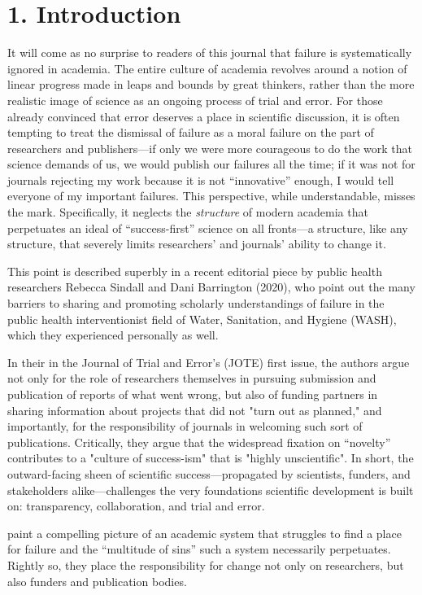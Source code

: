 \documentclass[empirical, author-date]{jote-article}
\author[0]{Stefan Gaillard}{\orcid{https://orcid.org/0000-0003-1956-7325}}
\affil[1]{}
\author[1]{Sean Devine}{\orcid{https://orcid.org/0000-0002-0445-2763}}
\affil[2]{}
\begin{document}
  \section{1. Introduction}

It will come as no surprise to readers of this journal that failure is systematically ignored in academia. The entire culture of academia revolves around a notion of linear progress made in leaps and bounds by great thinkers, rather than the more realistic image of science as an ongoing process of trial and error. For those already convinced that error deserves a place in scientific discussion, it is often tempting to treat the dismissal of failure as a moral failure on the part of researchers and publishers—if only we were more courageous to do the work that science demands of us, we would publish our failures all the time; if it was not for journals rejecting my work because it is not “innovative” enough, I would tell everyone of my important failures. This perspective, while understandable, misses the mark. Specifically, it neglects the \emph{structure }of modern academia that perpetuates an ideal of “success-first” science on all fronts—a structure, like any structure, that severely limits researchers' and journals' ability to change it. 

This point is described superbly in a recent editorial piece by public health researchers Rebecca Sindall and Dani Barrington (2020), who point out the many barriers to sharing and promoting scholarly understandings of failure in the public health interventionist field of Water, Sanitation, and Hygiene (WASH), which they experienced personally as well. 

In their  in the Journal of Trial and Error's (JOTE) first issue, the authors argue not only for the role of researchers themselves in pursuing submission and publication of reports of what went wrong, but also of funding partners in sharing information about projects that did not "turn out as planned," and importantly, for the responsibility of journals in welcoming such sort of publications. Critically, they argue that the widespread fixation on “novelty” contributes to a "culture of success-ism" that is "highly unscientific". In short, the outward-facing sheen of scientific success—propagated by scientists, funders, and stakeholders alike—challenges the very foundations scientific development is built on: transparency, collaboration, and trial and error.

\textcite{Sindall2020} paint a compelling picture of an academic system that struggles to find a place for failure and the “multitude of sins” such a system necessarily perpetuates. Rightly so, they place the responsibility for change not only on researchers, but also funders and publication bodies. 
\end{document}

